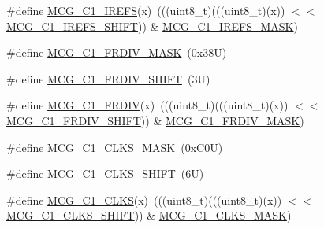 \begin{DoxyCompactItemize}
\item 
\#define \mbox{\hyperlink{group___m_c_g___register___masks_gadebea24932568e50a064507270a209c8}{M\+C\+G\+\_\+\+C1\+\_\+\+I\+R\+E\+FS}}(x)~(((uint8\+\_\+t)(((uint8\+\_\+t)(x)) $<$$<$ \mbox{\hyperlink{group___m_c_g___register___masks_gada376a938782b95d20788418a2564476}{M\+C\+G\+\_\+\+C1\+\_\+\+I\+R\+E\+F\+S\+\_\+\+S\+H\+I\+FT}})) \& \mbox{\hyperlink{group___m_c_g___register___masks_gadc14970d17e8ee736a16805a412a87fe}{M\+C\+G\+\_\+\+C1\+\_\+\+I\+R\+E\+F\+S\+\_\+\+M\+A\+SK}})
\item 
\#define \mbox{\hyperlink{group___m_c_g___register___masks_gac7762b84f41121882f4d1fbcaa839aeb}{M\+C\+G\+\_\+\+C1\+\_\+\+F\+R\+D\+I\+V\+\_\+\+M\+A\+SK}}~(0x38\+U)
\item 
\#define \mbox{\hyperlink{group___m_c_g___register___masks_gaee124d0ce81f6e815dbbcac62440708b}{M\+C\+G\+\_\+\+C1\+\_\+\+F\+R\+D\+I\+V\+\_\+\+S\+H\+I\+FT}}~(3\+U)
\item 
\#define \mbox{\hyperlink{group___m_c_g___register___masks_ga39519f6e6a3b433988eca107d0e7d460}{M\+C\+G\+\_\+\+C1\+\_\+\+F\+R\+D\+IV}}(x)~(((uint8\+\_\+t)(((uint8\+\_\+t)(x)) $<$$<$ \mbox{\hyperlink{group___m_c_g___register___masks_gaee124d0ce81f6e815dbbcac62440708b}{M\+C\+G\+\_\+\+C1\+\_\+\+F\+R\+D\+I\+V\+\_\+\+S\+H\+I\+FT}})) \& \mbox{\hyperlink{group___m_c_g___register___masks_gac7762b84f41121882f4d1fbcaa839aeb}{M\+C\+G\+\_\+\+C1\+\_\+\+F\+R\+D\+I\+V\+\_\+\+M\+A\+SK}})
\item 
\#define \mbox{\hyperlink{group___m_c_g___register___masks_gae9a1db29d56ef219e4df3dc9d945b08e}{M\+C\+G\+\_\+\+C1\+\_\+\+C\+L\+K\+S\+\_\+\+M\+A\+SK}}~(0x\+C0\+U)
\item 
\#define \mbox{\hyperlink{group___m_c_g___register___masks_ga9ca1068f336097a94984ba4bba0798d6}{M\+C\+G\+\_\+\+C1\+\_\+\+C\+L\+K\+S\+\_\+\+S\+H\+I\+FT}}~(6\+U)
\item 
\#define \mbox{\hyperlink{group___m_c_g___register___masks_gaffe61ac58c90dfaebbd4748c0dea558c}{M\+C\+G\+\_\+\+C1\+\_\+\+C\+L\+KS}}(x)~(((uint8\+\_\+t)(((uint8\+\_\+t)(x)) $<$$<$ \mbox{\hyperlink{group___m_c_g___register___masks_ga9ca1068f336097a94984ba4bba0798d6}{M\+C\+G\+\_\+\+C1\+\_\+\+C\+L\+K\+S\+\_\+\+S\+H\+I\+FT}})) \& \mbox{\hyperlink{group___m_c_g___register___masks_gae9a1db29d56ef219e4df3dc9d945b08e}{M\+C\+G\+\_\+\+C1\+\_\+\+C\+L\+K\+S\+\_\+\+M\+A\+SK}})
\end{DoxyCompactItemize}
